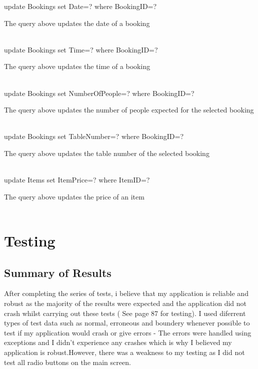 \begin{sql}
update Bookings set Date=? where BookingID=?
\end{sql}
The query above updates the date of a booking \\ \\


\begin{sql}
update Bookings set Time=? where BookingID=?
\end{sql}
The query above updates the time of a booking \\ \\


\begin{sql}
update Bookings set NumberOfPeople=? where BookingID=?
\end{sql}
The query above updates the number of people expected for the selected booking \\ \\


\begin{sql}
update Bookings set TableNumber=? where BookingID=?
\end{sql}
The query above updates the table number of the selected booking \\ \\


\begin{sql}
update Items set ItemPrice=? where ItemID=?
\end{sql}
The query above updates the price of an item \\ \\


\section{Testing}

\subsection{Summary of Results}
After completing the series of tests, i believe that my application is reliable and robust as the majority of the results were expected and the application did not crash whilst carrying out these tests ( See page 87 for testing). I used diferrent types of test data such as normal, erroneous and boundery whenever possible to test if my application would crash or give errors - The errors were handled using exceptions and I didn't experience any crashes which is why I believed my application is robust.However, there was a weakness to my testing as I did not test all radio buttons on the main screen.


